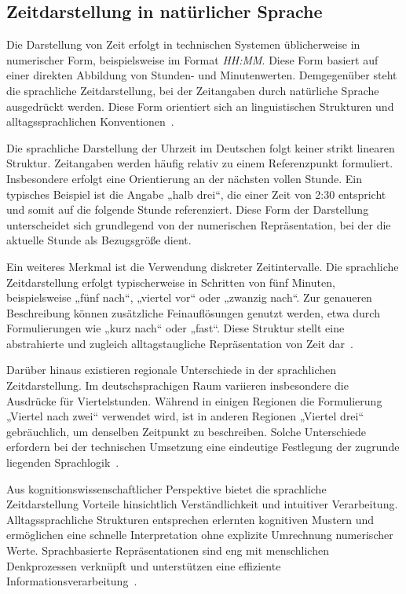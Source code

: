 \subsection{Zeitdarstellung in natürlicher Sprache}
Die Darstellung von Zeit erfolgt in technischen Systemen üblicherweise in numerischer Form, beispielsweise im Format \textit{HH:MM}.
Diese Form basiert auf einer direkten Abbildung von Stunden- und Minutenwerten.
Demgegenüber steht die sprachliche Zeitdarstellung, bei der Zeitangaben durch natürliche Sprache ausgedrückt werden.
Diese Form orientiert sich an linguistischen Strukturen und alltagssprachlichen Konventionen~\cite[S.~14--35]{klein1994time}.

Die sprachliche Darstellung der Uhrzeit im Deutschen folgt keiner strikt linearen Struktur.
Zeitangaben werden häufig relativ zu einem Referenzpunkt formuliert.
Insbesondere erfolgt eine Orientierung an der nächsten vollen Stunde.
Ein typisches Beispiel ist die Angabe „halb drei“, die einer Zeit von 2:30 entspricht und somit auf die folgende Stunde referenziert.
Diese Form der Darstellung unterscheidet sich grundlegend von der numerischen Repräsentation, bei der die aktuelle Stunde als Bezugsgröße dient\cites[S.~36]{klein1994time}[S.~xv]{lakoff1987women}.

Ein weiteres Merkmal ist die Verwendung diskreter Zeitintervalle.
Die sprachliche Zeitdarstellung erfolgt typischerweise in Schritten von fünf Minuten, beispielsweise „fünf nach“, „viertel vor“ oder „zwanzig nach“.
Zur genaueren Beschreibung können zusätzliche Feinauflösungen genutzt werden, etwa durch Formulierungen wie „kurz nach“ oder „fast“.
Diese Struktur stellt eine abstrahierte und zugleich alltagstaugliche Repräsentation von Zeit dar~\cite[S.~208\,ff.]{langacker1987foundations}.

Darüber hinaus existieren regionale Unterschiede in der sprachlichen Zeitdarstellung.
Im deutschsprachigen Raum variieren insbesondere die Ausdrücke für Viertelstunden.
Während in einigen Regionen die Formulierung „Viertel nach zwei“ verwendet wird, ist in anderen Regionen „Viertel drei“ gebräuchlich, um denselben Zeitpunkt zu beschreiben.
Solche Unterschiede erfordern bei der technischen Umsetzung eine eindeutige Festlegung der zugrunde liegenden Sprachlogik~\cite[S.~212]{kucharczyk2012sprachliche}.

Aus kognitionswissenschaftlicher Perspektive bietet die sprachliche Zeitdarstellung Vorteile hinsichtlich Verständlichkeit und intuitiver Verarbeitung.
Alltagssprachliche Strukturen entsprechen erlernten kognitiven Mustern und ermöglichen eine schnelle Interpretation ohne explizite Umrechnung numerischer Werte.
Sprachbasierte Repräsentationen sind eng mit menschlichen Denkprozessen verknüpft und unterstützen eine effiziente Informationsverarbeitung~\cites[S.~15--18]{pinker1994language}[S.~xv]{lakoff1987women}.